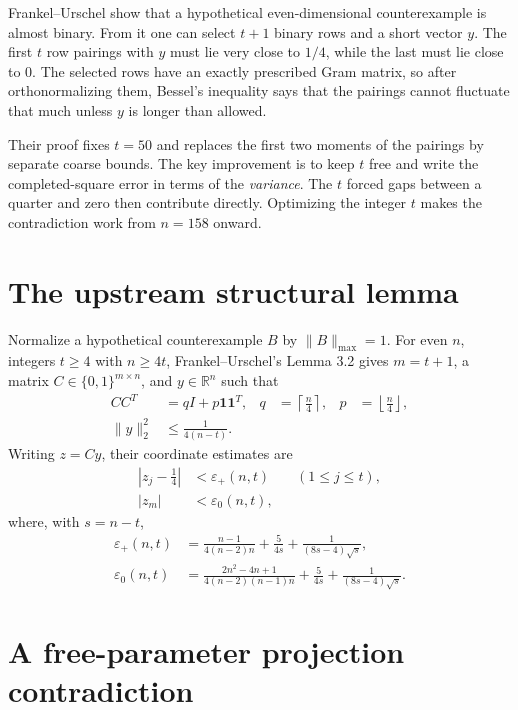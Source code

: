 \documentclass[10pt]{article}
\newcommand{\one}{\mathbf 1}
\begin{document}
Frankel--Urschel show that a hypothetical even-dimensional counterexample is
almost binary.  From it one can select $t+1$ binary rows and a short vector
$y$.  The first $t$ row pairings with $y$ must lie very close to $1/4$, while
the last must lie close to $0$.  The selected rows have an exactly prescribed
Gram matrix, so after orthonormalizing them, Bessel's inequality says that the
pairings cannot fluctuate that much unless $y$ is longer than allowed.

Their proof fixes $t=50$ and replaces the first two moments of the pairings by
separate coarse bounds.  The key improvement is to keep $t$ free and write the
completed-square error in terms of the \emph{variance}.  The $t$ forced gaps
between a quarter and zero then contribute directly.  Optimizing the integer
$t$ makes the contradiction work from $n=158$ onward.

\section*{The upstream structural lemma}

Normalize a hypothetical counterexample $B$ by $\|B\|_{\max}=1$.  For even
$n$, integers $t\ge4$ with $n\ge4t$, Frankel--Urschel's Lemma 3.2 gives
$m=t+1$, a matrix $C\in\{0,1\}^{m\times n}$, and $y\in\mathbb R^n$ such that
\begin{align}
 CC^T&=qI+p\one\one^T,&
 q&=\left\lceil\frac n4\right\rceil,&
 p&=\left\lfloor\frac n4\right\rfloor,\label{eq:gram}\\
 \|y\|_2^2&\le\frac1{4(n-t)}.\label{eq:ynorm}
\end{align}
Writing $z=Cy$, their coordinate estimates are
\begin{align}
 |z_j-\frac14|&<\varepsilon_+(n,t) &&(1\le j\le t),\label{eq:zplus}\\
 |z_m|&<\varepsilon_0(n,t),\label{eq:zzero}
\end{align}
where, with $s=n-t$,
\begin{align*}
\varepsilon_+(n,t)
 &=\frac{n-1}{4(n-2)n}+\frac5{4s}
   +\frac1{(8s-4)\sqrt{s}},\\
\varepsilon_0(n,t)
 &=\frac{2n^2-4n+1}{4(n-2)(n-1)n}+\frac5{4s}
   +\frac1{(8s-4)\sqrt{s}}.
\end{align*}

\section*{A free-parameter projection contradiction}
\end{document}
